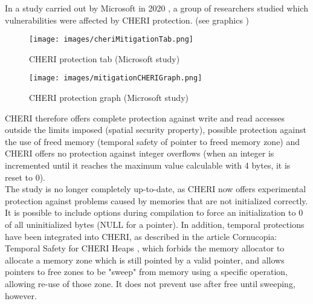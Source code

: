 \documentclass[a4paper, 11pt]{article}
\begin{document}
In a study carried out by Microsoft in 2020 \cite{joly2020security}, a group of researchers studied which vulnerabilities were affected by CHERI protection. (see graphics  )
\begin{figure}[h!]
	
	\texttt{[image: images/cheriMitigationTab.png]}
	\caption{CHERI protection tab (Microsoft study)\cite{joly2020security}}
	\label{sec:tab}
\end{figure}
\begin{figure}[h!]
	
	\texttt{[image: images/mitigationCHERIGraph.png]}
	\caption{CHERI protection graph (Microsoft study)\cite{joly2020security}}
	\label{sec:graph}
\end{figure}
CHERI therefore offers complete protection against write and read accesses outside the limits imposed (spatial security property), possible protection against the use of freed memory (temporal safety of pointer to freed memory zone) and CHERI offers no protection against integer overflows (when an integer is incremented until it reaches the maximum value calculable with 4 bytes, it is reset to 0). 
\\
The study is no longer completely up-to-date, as CHERI now offers experimental protection against problems caused by memories that are not initialized correctly. It is possible to include options during compilation to force an initialization to 0 of all uninitialized bytes (NULL for a pointer).
In addition, temporal protections have been integrated into CHERI, as described in the article Cornucopia: Temporal Safety for CHERI Heaps \cite{filardo2020cornucopia}, which forbids the memory allocator to allocate a memory zone which is still pointed by a valid pointer, and allows pointers to free zones to be "sweep" from memory using a specific operation, allowing re-use of those zone. It does not prevent use after free until sweeping, however.
\\
\end{document}
